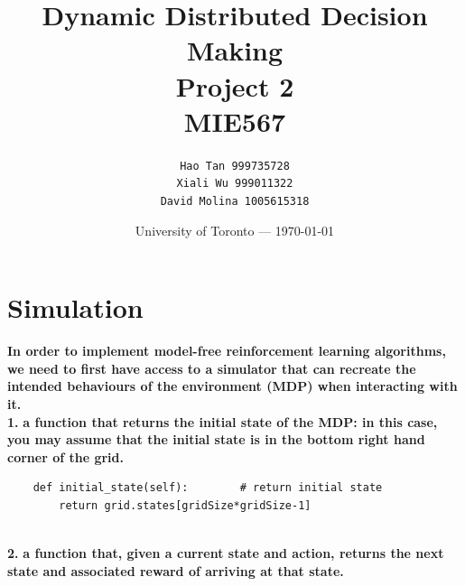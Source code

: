 \documentclass[11pt]{article}
\title{Dynamic Distributed Decision Making \\Project 2 \\MIE567} %
\author{\texttt{Hao Tan 999735728}\\ \texttt{Xiali Wu 999011322} \\ \texttt{David Molina 1005615318}} %
\date{University of Toronto --- \today} %
\begin{document}
\maketitle

\section{Simulation}
\textbf{In order to implement model-free reinforcement learning algorithms, we need to first have access to a simulator that can recreate the intended
behaviours of the environment (MDP) when interacting with it.}
\\

\noindent
\textbf{1.}
\noindent
\textbf{a function that returns the initial state of the MDP: in this case, you may assume
that the initial state is in the bottom right hand corner of the grid.}

\lstset{language=Python}
\lstset{frame=lines}
\lstset{basicstyle=\footnotesize}
\begin{lstlisting}
    def initial_state(self):        # return initial state
        return grid.states[gridSize*gridSize-1]
\end{lstlisting}
\\

\noindent
\textbf{2.}
\noindent
\textbf{a function that, given a current state and action, returns the next state and associated reward of arriving at that state.}
\end{document}
